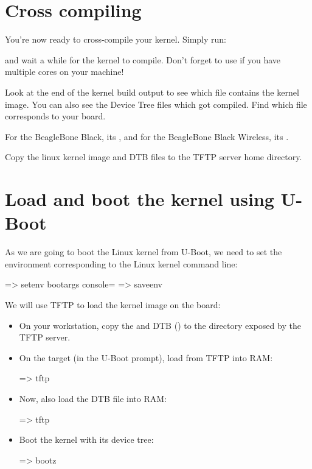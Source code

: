 \section{Cross compiling}

You're now ready to cross-compile your kernel. Simply run:


and wait a while for the kernel to compile. Don't forget to use
 if you have multiple cores on your machine!

Look at the end of the kernel build output to see which file contains
the kernel image. You can also see the Device Tree  files
which got compiled. Find which  file corresponds to your
board.

{For the BeagleBone Black, its ,
and for the BeagleBone Black Wireless, its
.}
{}

Copy the linux kernel image and DTB files to the TFTP server
home directory.

\section{Load and boot the kernel using U-Boot}

As we are going to boot the Linux kernel from U-Boot,
we need to set the  environment corresponding
to the Linux kernel command line:

\begin{ubootinput}
=> setenv bootargs console=%
=> saveenv
\end{ubootinput}
We will use TFTP to load the kernel image on the board:

\begin{itemize}

\item On your workstation, copy the  and DTB
(\texttt\dtbname) to the directory exposed by the TFTP server.

\item On the target (in the U-Boot prompt), load  from
TFTP into RAM:
\begin{ubootinput}
=> tftp %
\end{ubootinput}

\item Now, also load the DTB file into RAM:
\begin{ubootinput}
=> tftp %
\end{ubootinput}

\item Boot the kernel with its device tree:
\begin{ubootinput}
=> bootz %
\end{ubootinput}

\end{itemize}

